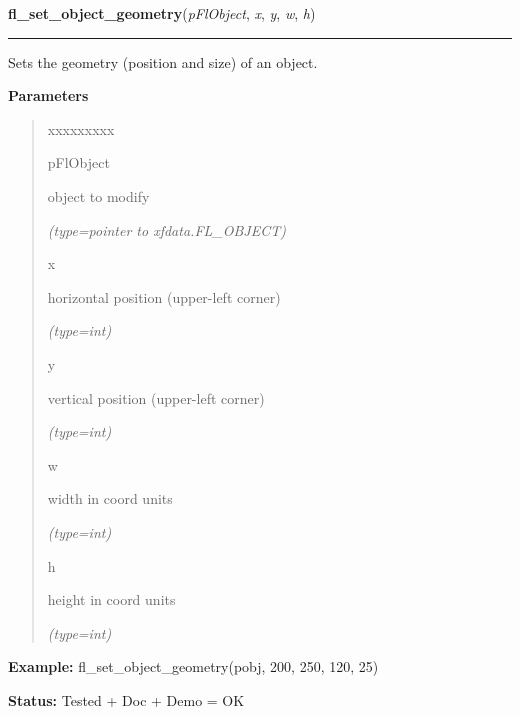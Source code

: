\hspace{.8\funcindent}\begin{boxedminipage}{\funcwidth}

    \raggedright \textbf{fl\_set\_object\_geometry}(\textit{pFlObject}, \textit{x}, \textit{y}, \textit{w}, \textit{h})

    \vspace{-1.5ex}

    \rule{\textwidth}{0.5\fboxrule}
\setlength{\parskip}{2ex}
    Sets the geometry (position and size) of an object.

\setlength{\parskip}{1ex}
      \textbf{Parameters}
      \vspace{-1ex}

      \begin{quote}
        \begin{Ventry}{xxxxxxxxx}

          \item[pFlObject]

          object to modify

            {\it (type=pointer to xfdata.FL\_OBJECT)}

          \item[x]

          horizontal position (upper-left corner)

            {\it (type=int)}

          \item[y]

          vertical position (upper-left corner)

            {\it (type=int)}

          \item[w]

          width in coord units

            {\it (type=int)}

          \item[h]

          height in coord units

            {\it (type=int)}

        \end{Ventry}

      \end{quote}

\textbf{Example:} fl\_set\_object\_geometry(pobj, 200, 250, 120, 25)



\textbf{Status:} Tested + Doc + Demo = OK



    \end{boxedminipage}


